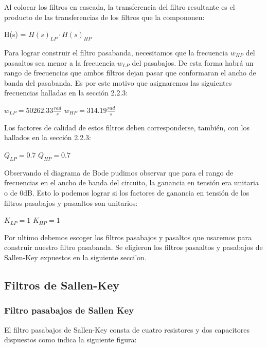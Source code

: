 \documentclass[12pt, titlepage]{article}
\begin{document}
    Al colocar los filtros en cascada, la transferencia del filtro resultante es el producto de las transferencias de los filtros que la compononen:
    \begin{center}
        H(s) = $H(s)_{LP}\cdot H(s)_{HP} $
    \end{center}
    
    Para lograr construir el filtro pasabanda, necesitamos que la frecuencia $w_{HP}$ del pasaaltos sea menor a la frecuencia $w_{LP}$ del pasabajos. De esta forma habrá un rango de frecuencias que ambos filtros dejan pasar que conformaran el ancho de banda del pasabanda.
    Es por este motivo que asignaremos las siguientes frecuencias halladas en la sección 2.2.3:
    \begin{center}
        $w_{LP} = 50262.33\frac{rad}{s}$ \hspace{10mm}$w_{HP} = 314.19\frac{rad}{s}$
    \end{center}
    Los factores de calidad de estos filtros deben corresponderse, también, con los hallados en la sección 2.2.3:
     \begin{center}
        $Q_{LP} = 0.7$ \hspace{10mm}$Q_{HP} = 0.7$
    \end{center}
    Observando el diagrama de Bode pudimos observar que para el rango de frecuencias en el ancho de banda del circuito, la ganancia en tensión era unitaria o de 0dB. Esto lo podemos lograr si los factores de ganancia en tensión de los filtros pasabajos y pasaaltos son unitarios:
    \begin{center}
        $K_{LP} = 1$ \hspace{10mm}$K_{HP} = 1$
    \end{center}
    
 
    Por ultimo debemos escoger los filtros pasabajos y pasaltos que usaremos para construir nuestro filtro pasabanda. Se eligieron los filtros pasaaltos y pasabajos de Sallen-Key expuestos en la siguiente secci'on.
    
    \subsection{Filtros de Sallen-Key}
    
    \subsubsection{Filtro pasabajos de Sallen Key}
    El filtro pasabajos de Sallen-Key consta de cuatro resistores y dos capacitores dispuestos como indica la siguiente figura:
    
\end{document}
